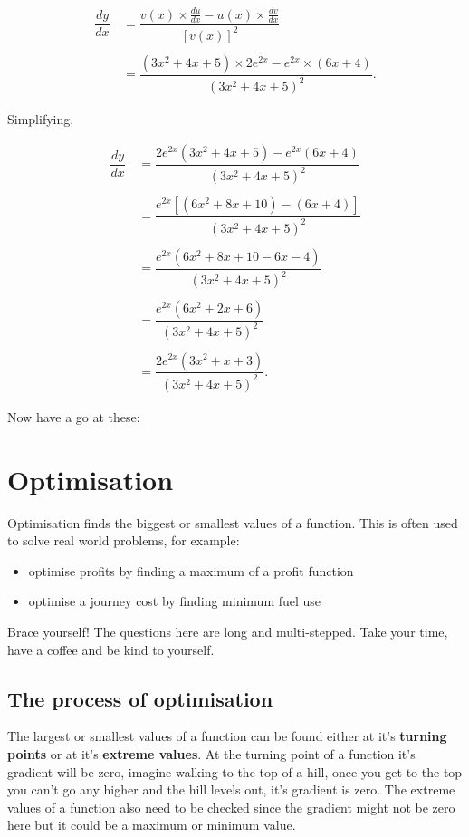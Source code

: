 \documentclass[
  a4paper,
]{scrbook}
\providecommand{\tightlist}{%
  \setlength{\itemsep}{0pt}\setlength{\parskip}{0pt}}
\begin{document}
\[
\begin{aligned}
\dfrac{dy}{dx} &\,= \dfrac{v(x) \times \frac{du}{dx} - u(x) \times\frac{dv}{dx}}{[v(x)]^2} \\ \\
&\,=\dfrac{(3x^2+4x+5) \times 2e^{2x} - e^{2x} \times (6x+4)}{(3x^2+4x+5)^2}.
\end{aligned}
\]

Simplifying,

\[
\begin{aligned}
\dfrac{dy}{dx} &\,=\dfrac{2e^{2x}(3x^2+4x+5) - e^{2x}(6x+4)}{(3x^2+4x+5)^2} \\ \\
&\,=\dfrac{e^{2x}[(6x^2+8x+10) - (6x+4)]}{(3x^2+4x+5)^2} \\ \\
&\,=\dfrac{e^{2x}(6x^2+8x+10 - 6x - 4)}{(3x^2+4x+5)^2} \\ \\
&\,=\dfrac{e^{2x}(6x^2+2x+6)}{(3x^2+4x+5)^2} \\ \\
&\,=\dfrac{2e^{2x}(3x^2+x+3)}{(3x^2+4x+5)^2}.
\end{aligned}
\]

Now have a go at these:


\chapter{Optimisation}\label{optimisation}

Optimisation finds the biggest or smallest values of a function. This is
often used to solve real world problems, for example:

\begin{itemize}
\tightlist
\item
  optimise profits by finding a maximum of a profit function
\item
  optimise a journey cost by finding minimum fuel use
\end{itemize}

Brace yourself! The questions here are long and multi-stepped. Take your
time, have a coffee and be kind to yourself.

\section{The process of optimisation}\label{the-process-of-optimisation}

The largest or smallest values of a function can be found either at it's
\textbf{turning points} or at it's \textbf{extreme values}. At the
turning point of a function it's gradient will be zero, imagine walking
to the top of a hill, once you get to the top you can't go any higher
and the hill levels out, it's gradient is zero. The extreme values of a
function also need to be checked since the gradient might not be zero
here but it could be a maximum or minimum value.
\end{document}
